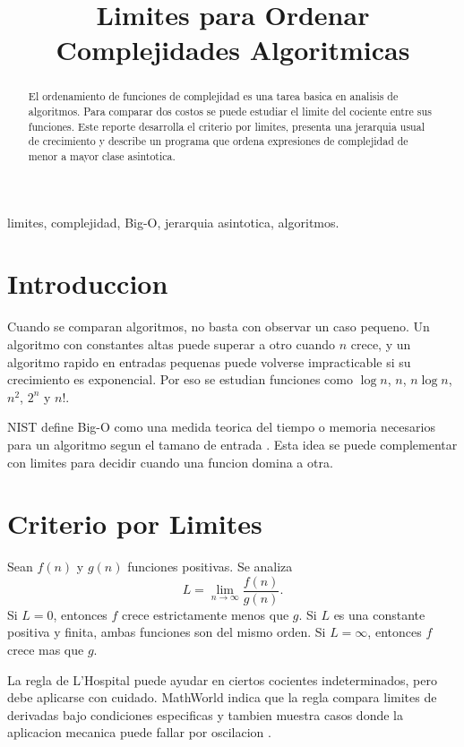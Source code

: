 \documentclass[conference]{IEEEtran}
\title{Limites para Ordenar Complejidades Algoritmicas}
\author{\IEEEauthorblockN{Ronquillo Nunez Braulio}
\IEEEauthorblockA{Analisis y Diseno de Algoritmos}}
\begin{document}
\maketitle

\begin{abstract}
El ordenamiento de funciones de complejidad es una tarea basica en analisis de
algoritmos. Para comparar dos costos se puede estudiar el limite del cociente
entre sus funciones. Este reporte desarrolla el criterio por limites, presenta
una jerarquia usual de crecimiento y describe un programa que ordena
expresiones de complejidad de menor a mayor clase asintotica.
\end{abstract}

\begin{IEEEkeywords}
limites, complejidad, Big-O, jerarquia asintotica, algoritmos.
\end{IEEEkeywords}

\section{Introduccion}
Cuando se comparan algoritmos, no basta con observar un caso pequeno. Un
algoritmo con constantes altas puede superar a otro cuando $n$ crece, y un
algoritmo rapido en entradas pequenas puede volverse impracticable si su
crecimiento es exponencial. Por eso se estudian funciones como $\log n$, $n$,
$n\log n$, $n^2$, $2^n$ y $n!$.

NIST define Big-O como una medida teorica del tiempo o memoria necesarios para
un algoritmo segun el tamano de entrada \cite{nist_big_o}. Esta idea se puede
complementar con limites para decidir cuando una funcion domina a otra.

\section{Criterio por Limites}
Sean $f(n)$ y $g(n)$ funciones positivas. Se analiza
\begin{equation}
L=\lim_{n\to\infty}\frac{f(n)}{g(n)}.
\end{equation}
Si $L=0$, entonces $f$ crece estrictamente menos que $g$. Si $L$ es una
constante positiva y finita, ambas funciones son del mismo orden. Si
$L=\infty$, entonces $f$ crece mas que $g$.

La regla de L'Hospital puede ayudar en ciertos cocientes indeterminados, pero
debe aplicarse con cuidado. MathWorld indica que la regla compara limites de
derivadas bajo condiciones especificas y tambien muestra casos donde la
aplicacion mecanica puede fallar por oscilacion \cite{mathworld_lhopital}.
\end{document}
